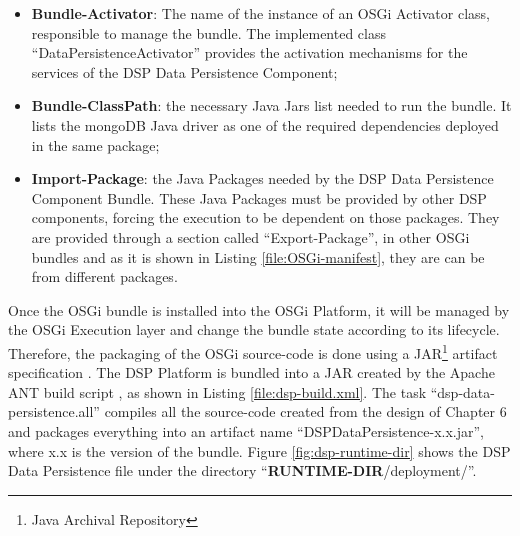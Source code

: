 \begin{itemize}
  \item \textbf{Bundle-Activator}: The name of the instance of an OSGi
  Activator class, responsible to manage the bundle. The implemented class
  ``DataPersistenceActivator'' provides the activation mechanisms for the
  services of the DSP Data Persistence Component;
  \item \textbf{Bundle-ClassPath}: the necessary Java Jars list needed to run
  the bundle. It lists the mongoDB Java driver as one of the required
  dependencies deployed in the same package;
  \item \textbf{Import-Package}: the Java Packages needed by the DSP Data
  Persistence Component Bundle. These Java Packages must be provided by other
  DSP components, forcing the execution to be dependent on those packages.
  They are provided through a section called ``Export-Package'', in other
  OSGi bundles and as it is shown in Listing \ref{file:OSGi-manifest}, they
  are can be from different packages.
\end{itemize}

Once the OSGi bundle is installed into the OSGi Platform, it will be managed by
the OSGi Execution layer and change the bundle state according to its
lifecycle. Therefore, the packaging of the OSGi source-code is done using a
JAR\footnote{Java Archival Repository} artifact specification
\cite{java-tutorial}. The DSP Platform is bundled into a JAR created by the
Apache ANT build script \cite{apache-ant}, as shown in Listing
\ref{file:dsp-build.xml}. The task ``dsp-data-persistence.all'' compiles all
the source-code created from the design of Chapter 6 and packages
everything into an artifact name ``DSPDataPersistence-x.x.jar'', where x.x is
the version of the bundle. Figure \ref{fig:dsp-runtime-dir} shows the DSP Data
Persistence file under the directory ``\textbf{RUNTIME-DIR}/deployment/''.

